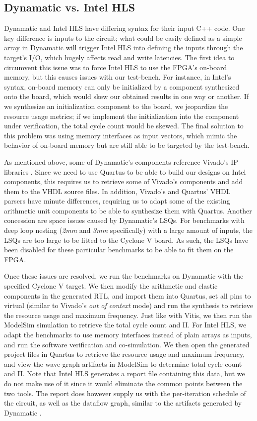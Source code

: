 \documentclass[final,5p,times,twocolumn]{elsarticle}
\begin{document}
\begin{spacing}{1.125}
\subsection{Dynamatic vs. Intel HLS}

Dynamatic and Intel HLS have differing syntax for their input C++ code. One key difference is inputs to the circuit; what could be easily defined as a simple array in Dynamatic will trigger Intel HLS into defining the inputs through the target's I/O, which hugely affects read and write latencies. The first idea to circumvent this issue was to force Intel HLS to use the FPGA's on-board memory, but this causes issues with our test-bench. For instance, in Intel's syntax, on-board memory can only be initialized by a component synthesized onto the board, which would skew our obtained results in one way or another. If we synthesize an initialization component to the board, we jeopardize the resource usage metrics; if we implement the initialization into the component under verification, the total cycle count would be skewed. The final solution to this problem was using memory interfaces as input vectors, which mimic the behavior of on-board memory but are still able to be targeted by the test-bench.

As mentioned above, some of Dynamatic's components reference Vivado's IP libraries \cite{dyn_repository}. Since we need to use Quartus to be able to build our designs on Intel components, this requires us to retrieve some of Vivado's components and add them to the VHDL source files. In addition, Vivado's and Quartus' VHDL parsers have minute differences, requiring us to adapt some of the existing arithmetic unit components to be able to synthesize them with Quartus. Another concession are space issues caused by Dynamatic's LSQs. For benchmarks with deep loop nesting (\textit{2mm} and \textit{3mm} specifically) with a large amount of inputs, the LSQs are too large to be fitted to the Cyclone V board. As such, the LSQs have been disabled for these particular benchmarks to be able to fit them on the FPGA.

Once these issues are resolved, we run the benchmarks on Dynamatic with the specified Cyclone V target. We then modify the arithmetic and elastic components in the generated RTL, and import them into Quartus, set all pins to virtual (similar to Vivado's \textit{out of context} mode) and run the synthesis to retrieve the resource usage and maximum frequency. Just like with Vitis, we then run the ModelSim simulation to retrieve the total cycle count and II. For Intel HLS, we adapt the benchmarks to use memory interfaces instead of plain arrays as inputs, and run the software verification and co-simulation. We then open the generated project files in Quartus to retrieve the resource usage and maximum frequency, and view the wave graph artifacts in ModelSim to determine total cycle count and II. Note that Intel HLS generates a report file containing this data, but we do not make use of it since it would eliminate the common points between the two tools. The report does however supply us with the per-iteration schedule of the circuit, as well as the dataflow graph, similar to the artifacts generated by Dynamatic \cite{intel_hls}\cite{modelsim}\cite{quartus}.


\end{spacing}
\end{document}
